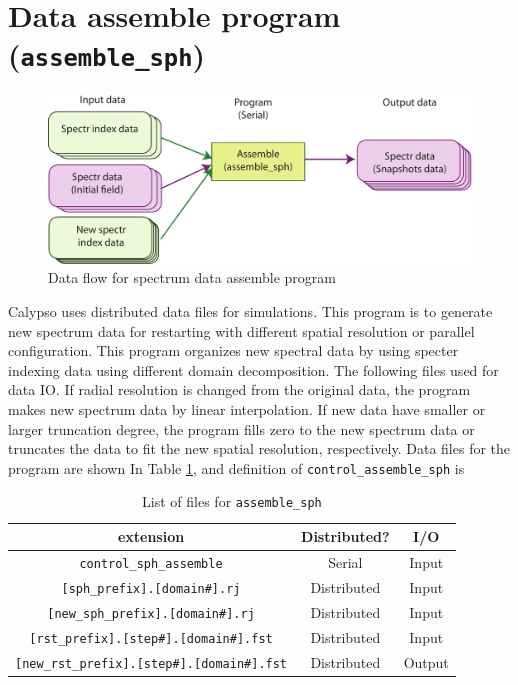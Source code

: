 \section{Data assemble program ({\tt assemble\_sph})}
%
\begin{figure}[htbp]
\begin{center}
\includegraphics*[width=130mm]{images/flow_4}
\end{center}
\caption{Data flow for spectrum data assemble program}
\label{fig:flow_4}
\end{figure}
%
Calypso uses distributed data files for simulations. This program is to generate new spectrum data for restarting with different spatial resolution or parallel configuration. This program organizes new spectral data by using specter indexing data using different domain decomposition. The following files used for data IO. If radial resolution is changed from the original data, the program makes new spectrum data by linear interpolation. If new data have smaller or larger truncation degree, the program fills zero to the new spectrum data or truncates the data to fit the new spatial resolution, respectively. Data files for the program are shown In Table \ref{table:assemble_newsph}, and definition of \verb|control_assemble_sph| is 
%
\begin{table}[htdp]
\caption{List of files for {\tt assemble\_sph} }
\begin{center} 
\begin{tabular}{|c|c|c|}
\hline
 extension & Distributed? & I/O \\ \hline
\verb|control_sph_assemble| & Serial & Input \\ \hline
\verb|[sph_prefix].[domain#].rj| &  Distributed & Input \\
\verb|[new_sph_prefix].[domain#].rj| &  Distributed & Input \\ \hline
\verb|[rst_prefix].[step#].[domain#].fst| &  Distributed & Input  \\
\verb|[new_rst_prefix].[step#].[domain#].fst| &  Distributed & Output \\ \hline
\end{tabular}
\end{center}
\label{table:assemble_newsph}
\end{table}
%

